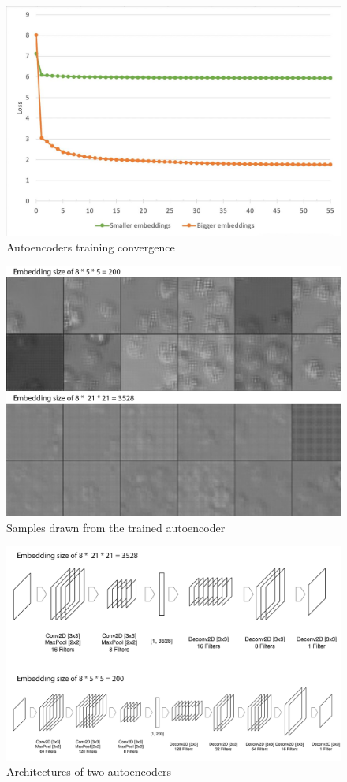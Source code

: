 \begin{figure}[H]
	\begin{center}
		\includegraphics[width=0.5\linewidth]{bilder/ae-embeddings/training.jpg}
		\caption{Autoencoders training convergence}\label{fig:ae-training}
	\end{center}
\end{figure}

\begin{figure}[H]
	\begin{center}
		\includegraphics[width=0.5\linewidth]{bilder/ae-embeddings/ae-samples.png}
		\caption{Samples drawn from the trained autoencoder}\label{fig:ae-samples}
	\end{center}
\end{figure}

\begin{figure}[H]
	\begin{center}
		\includegraphics[width=0.5\linewidth]{bilder/ae-embeddings/ae-architecture.png}
		\caption{Architectures of two autoencoders}\label{fig:ae-architecture}
	\end{center}
\end{figure}

